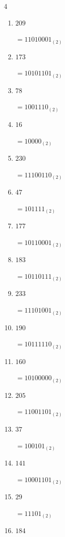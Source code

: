 \begin{multicols}{4}
\begin{enumerate}
        $=110010_{(2)}$

  \item $209$

        $=11010001_{(2)}$

  \item $173$

        $=10101101_{(2)}$

  \item $78$

        $=1001110_{(2)}$

  \item $16$

        $=10000_{(2)}$

  \item $230$

        $=11100110_{(2)}$

  \item $47$

        $=101111_{(2)}$

\columnbreak %

  \item $177$

        $=10110001_{(2)}$

  \item $183$

        $=10110111_{(2)}$

  \item $233$

        $=11101001_{(2)}$

  \item $190$

        $=10111110_{(2)}$

  \item $160$

        $=10100000_{(2)}$

  \item $205$

        $=11001101_{(2)}$

  \item $37$

        $=100101_{(2)}$

  \item $141$

        $=10001101_{(2)}$

  \item $29$

        $=11101_{(2)}$

  \item $184$


\end{enumerate}
\end{multicols}
